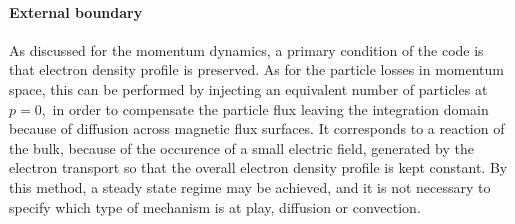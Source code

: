 \paragraph{External boundary}

As discussed for the momentum dynamics, a primary condition of the code is
that electron density profile is preserved. As for the particle losses in
momentum space, this can be performed by injecting an equivalent number of
particles at $p=0,$ in order to compensate the particle flux leaving the
integration domain because of diffusion across magnetic flux surfaces. It
corresponds to a reaction of the bulk, because of the occurence of a small
electric field, generated by the electron transport so that the overall
electron density profile is kept constant. By this method, a steady state
regime may be achieved, and it is not necessary to specify which type of
mechanism is at play, diffusion or convection.

